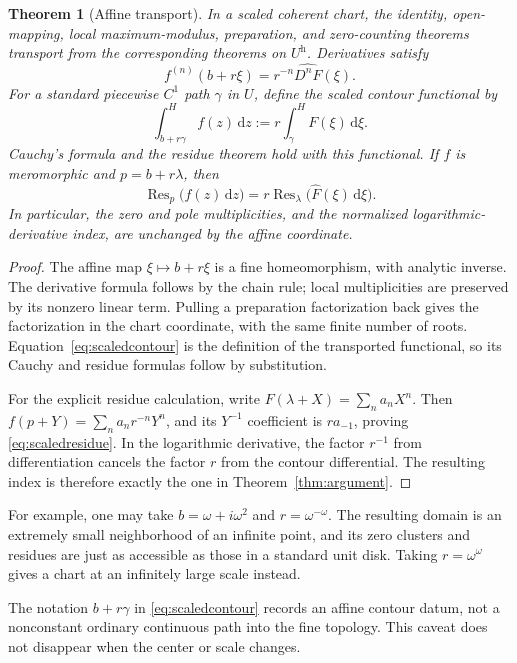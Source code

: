 \documentclass[11pt,a4paper]{article}
\newtheorem{theorem}{Theorem}[section]
\theoremstyle{definition}\newtheorem{definition}[theorem]{Definition}
\theoremstyle{remark}\newtheorem{remark}[theorem]{Remark}
\newcommand{\Res}{\operatorname{Res}}\newcommand{\ord}{\operatorname{ord}}
\newcommand{\ev}[1]{\widehat{#1}}
\newcommand{\hint}{\mathop{\int}\nolimits^{\!H}}
\newcommand{\halo}[1]{#1^{\mathrm h}}
\newcommand{\dd}{\,\mathrm d}
\numberwithin{equation}{section}
\begin{document}
\begin{theorem}[Affine transport]\label{thm:affine}
In a scaled coherent chart, the identity, open-mapping, local maximum-modulus, preparation, and zero-counting theorems transport from the corresponding theorems on $\halo U$. Derivatives satisfy
\[
 f^{(n)}(b+r\xi)=r^{-n}\ev{D^nF}(\xi).
\]
For a standard piecewise $C^1$ path $\gamma$ in $U$, define the scaled contour functional by
\begin{equation}\label{eq:scaledcontour}
 \hint_{b+r\gamma} f(z)\dd z
 :=r\hint_\gamma F(\xi)\dd\xi.
\end{equation}
Cauchy's formula and the residue theorem hold with this functional. If $f$ is meromorphic and $p=b+r\lambda$, then
\begin{equation}\label{eq:scaledresidue}
 \Res_{p}\bigl(f(z)\dd z\bigr)
 =r\Res_{\lambda}\bigl(\ev F(\xi)\dd\xi\bigr).
\end{equation}
In particular, the zero and pole multiplicities, and the normalized logarithmic-derivative index, are unchanged by the affine coordinate.
\end{theorem}
\begin{proof}
The affine map $\xi\mapsto b+r\xi$ is a fine homeomorphism, with analytic inverse. The derivative formula follows by the chain rule; local multiplicities are preserved by its nonzero linear term. Pulling a preparation factorization back gives the factorization in the chart coordinate, with the same finite number of roots. Equation~\eqref{eq:scaledcontour} is the definition of the transported functional, so its Cauchy and residue formulas follow by substitution.

For the explicit residue calculation, write $F(\lambda+X)=\sum_n a_nX^n$. Then
$f(p+Y)=\sum_n a_nr^{-n}Y^n$, and its $Y^{-1}$ coefficient is $ra_{-1}$, proving \eqref{eq:scaledresidue}. In the logarithmic derivative, the factor $r^{-1}$ from differentiation cancels the factor $r$ from the contour differential. The resulting index is therefore exactly the one in Theorem~\ref{thm:argument}.
\end{proof}
For example, one may take $b=\omega+i\omega^2$ and $r=\omega^{-\omega}$. The resulting domain is an extremely small neighborhood of an infinite point, and its zero clusters and residues are just as accessible as those in a standard unit disk. Taking $r=\omega^\omega$ gives a chart at an infinitely large scale instead.

The notation $b+r\gamma$ in \eqref{eq:scaledcontour} records an affine contour datum, not a nonconstant ordinary continuous path into the fine topology. This caveat does not disappear when the center or scale changes.
\end{document}
